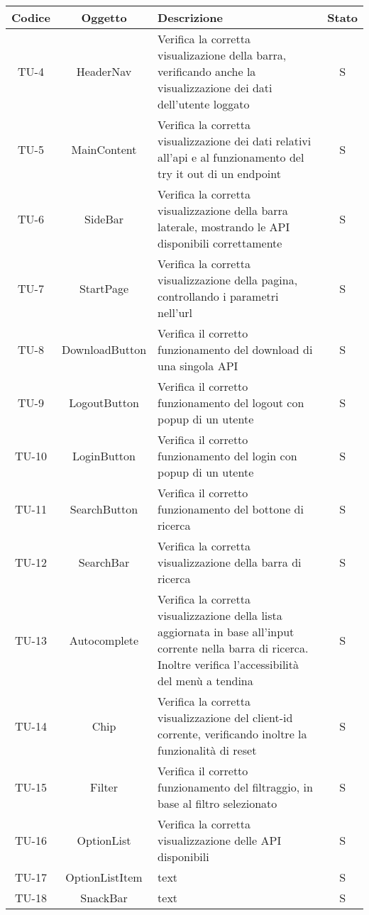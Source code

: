 \begin{center}
  \label{tab:test-unita-componenti}
  \begin{longtable}{|c|c|p{}|c|}
  \hline
  \textbf{Codice} & \textbf{Oggetto} & \textbf{Descrizione} & \textbf{Stato}\\
  \hline
  TU-4 &HeaderNav &Verifica la corretta visualizazione della barra, verificando anche la visualizzazione dei dati dell'utente loggato  &S \\
  \hline
  TU-5 &MainContent &Verifica la corretta visualizzazione dei dati relativi all'api e al funzionamento del try it out di un endpoint &S \\
  \hline
  TU-6 &SideBar &Verifica la corretta visualizzazione della barra laterale, mostrando le API disponibili correttamente &S \\
  \hline
  TU-7 &StartPage &Verifica la corretta visualizzazione della pagina, controllando i parametri nell'url &S \\
  \hline
  TU-8 &DownloadButton &Verifica il corretto funzionamento del download di una singola API &S \\
  \hline
  TU-9 &LogoutButton &Verifica il corretto funzionamento del logout con popup di un utente &S \\
  \hline
  TU-10 &LoginButton &Verifica il corretto funzionamento del login con popup di un utente &S \\
  \hline
  TU-11 &SearchButton &Verifica il corretto funzionamento del bottone di ricerca &S \\
  \hline
  TU-12 &SearchBar &Verifica la corretta visualizzazione della barra di ricerca &S \\
  \hline
  TU-13 &Autocomplete &Verifica la corretta visualizzazione della lista aggiornata in base all'input corrente nella barra di ricerca. Inoltre verifica l'accessibilità del menù a tendina  &S \\
  \hline
  TU-14 &Chip &Verifica la corretta visualizzazione del client-id corrente, verificando inoltre la funzionalità di reset &S \\
  \hline
  TU-15 &Filter &Verifica il corretto funzionamento del filtraggio, in base al filtro selezionato &S \\
  \hline
  TU-16 &OptionList &Verifica la corretta visualizzazione delle API disponibili &S \\
  \hline
  TU-17 &OptionListItem &text &S \\
  \hline
  TU-18 &SnackBar &text &S \\
  \hline
\end{longtable}
\end{center}

